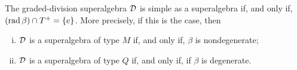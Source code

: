 


\begin{cor}\label{cor:tilde-beta-nondeg}
    The graded-division superalgebra $\mathcal{D}$ is simple as a superalgebra if, and only if, $(\operatorname{rad} \beta) \cap T^+ = \{e\}$. 
    More precisely, if this is the case, then
    \begin{enumerate}[(i)]
        \item $\mathcal{D}$ is a superalgebra of type $M$ if, and only if, $\beta$ is nondegenerate;
        \item $\mathcal{D}$ is a superalgebra of type $Q$ if, and only if, if $\beta$ is degenerate.
    \end{enumerate}
\end{cor}

